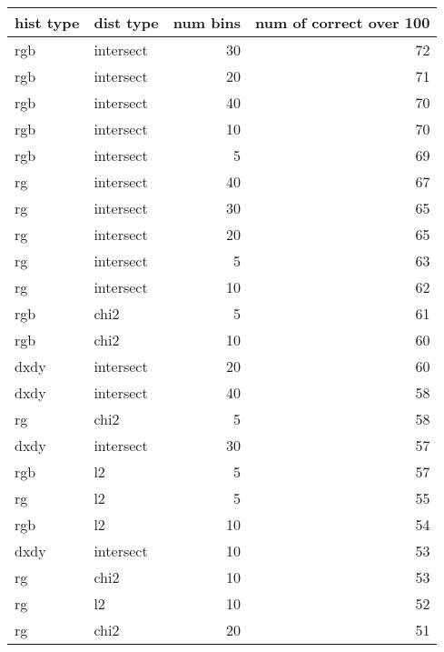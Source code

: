 \documentclass{article}
\begin{document}
\begin{center}
\begin{tabular}{llrr}
\toprule
hist type &  dist type &  num bins &  num of correct over 100 \\
\midrule
      rgb &  intersect &        30 &                       72 \\
      rgb &  intersect &        20 &                       71 \\
      rgb &  intersect &        40 &                       70 \\
      rgb &  intersect &        10 &                       70 \\
      rgb &  intersect &         5 &                       69 \\
       rg &  intersect &        40 &                       67 \\
       rg &  intersect &        30 &                       65 \\
       rg &  intersect &        20 &                       65 \\
       rg &  intersect &         5 &                       63 \\
       rg &  intersect &        10 &                       62 \\
      rgb &       chi2 &         5 &                       61 \\
      rgb &       chi2 &        10 &                       60 \\
     dxdy &  intersect &        20 &                       60 \\
     dxdy &  intersect &        40 &                       58 \\
       rg &       chi2 &         5 &                       58 \\
     dxdy &  intersect &        30 &                       57 \\
      rgb &         l2 &         5 &                       57 \\
       rg &         l2 &         5 &                       55 \\
      rgb &         l2 &        10 &                       54 \\
     dxdy &  intersect &        10 &                       53 \\
       rg &       chi2 &        10 &                       53 \\
       rg &         l2 &        10 &                       52 \\
       rg &       chi2 &        20 &                       51 \\

\end{tabular}
\end{center}
\end{document}
